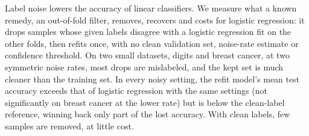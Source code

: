 Label noise lowers the accuracy of linear classifiers.
We measure what a known remedy, an out-of-fold filter, removes, recovers and costs for logistic regression: it drops samples whose given labels disagree with a logistic regression fit on the other folds, then refits once, with no clean validation set, noise-rate estimate or confidence threshold.
On two small datasets, digits and breast cancer, at two symmetric noise rates, most drops are mislabeled, and the kept set is much cleaner than the training set.
In every noisy setting, the refit model's mean test accuracy exceeds that of logistic regression with the same settings (not significantly on breast cancer at the lower rate) but is below the clean-label reference, winning back only part of the lost accuracy.
With clean labels, few samples are removed, at little cost.
